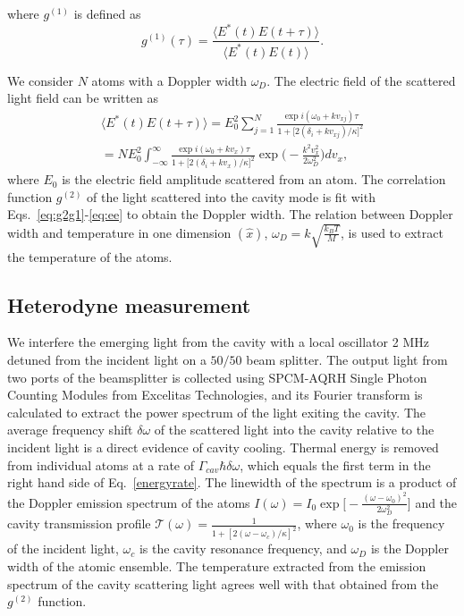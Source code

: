 \documentclass[aps,prl,superscriptaddress,onecloumn,nobibnotes]{revtex4-1}
\begin{document}
where $g^{(1)}$ is defined as
\begin{equation}
g^{(1)}(\tau)= \frac{ \langle E^*(t) E(t+\tau)\rangle }{ \langle E^*(t) E(t)\rangle }. 
\label{eq:g1}
\end{equation}
 
We consider $N$ atoms with a Doppler width $\omega_D$. The electric field of the scattered light field can be written as
\begin{eqnarray}
\langle E^*(t) E(t+\tau)\rangle = E_0^2 \sum_{j=1}^N \frac{\exp{ i(\omega_0 + k v_{xj}) \tau}}{1+\big[ 2(\delta_i+ k v_{xj})/\kappa \big]^2} \nonumber  \\ 
=N E_0^2 \int_{-\infty}^{\infty} \frac{\exp{ i (\omega_0 + k v_{x}) \tau}}{1+\big[ 2(\delta_i+ k v_{x})/\kappa \big]^2}\exp{\Big( -\frac{k^2 v_x^2}{2\omega_D^2} \Big)}dv_x,
\label{eq:ee}
\end{eqnarray}
where $E_0$ is the electric field amplitude scattered from an atom. The correlation function $g^{(2)}$ of the light scattered into the cavity mode is fit with Eqs.~\ref{eq:g2g1}-\ref{eq:ee} to obtain the Doppler width. The relation between Doppler width and temperature in one dimension $(\hat{x})$, $\omega_D=k \sqrt{\frac{k_B T}{M}}$, is used to extract the temperature of the atoms.\par





\subsection*{Heterodyne measurement} 


We interfere the emerging light from the cavity with a local oscillator 2 MHz detuned from the incident light on a $50/50$ beam splitter. The output light from two ports of the beamsplitter is collected using SPCM-AQRH Single Photon Counting Modules from Excelitas Technologies, and its Fourier
 transform is calculated to extract the power spectrum of the light exiting the cavity. The average frequency shift $\delta \omega$ of the scattered light into the cavity relative to the incident light is a direct evidence of cavity cooling. Thermal energy is removed from individual atoms at a rate of $\Gamma_{cav} \hbar \delta \omega$, which equals the first term in the right hand side of Eq.~\ref{energyrate}. The linewidth of the spectrum is a product of the Doppler emission spectrum of the atoms $I(\omega)=I_0 \exp{\big[-\frac{(\omega-\omega_0)^2}{2\omega_D^2}\big]}$ and the cavity transmission profile $\mathcal{T(\omega)}=\frac{1}{1+[2(\omega-\omega_c)/\kappa]^2}$, where $\omega_0$ is the frequency of the incident light, $\omega_c$ is the cavity resonance frequency, and $\omega_D$ is the Doppler width of the atomic ensemble. The temperature extracted from the emission spectrum of the cavity scattering light agrees well with that obtained from the $g^{(2)}$ function.
 
\end{document}
